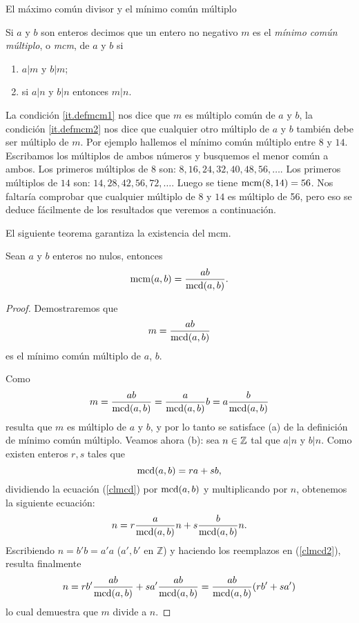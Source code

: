 \begin{section}{El máximo común divisor y el mínimo común múltiplo}
\begin{definicion}\label{def-mcm}
Si $a$ y $b$ son enteros decimos que un entero no negativo $m$ es el \textit{mínimo común múltiplo}, o \textit{mcm}, de $a$ y $b$ si
\begin{enumerate}[label=\textit{\alph*)}]
\item\label{it.defmcm1} $ a|m$ y $b|m$;
\item\label{it.defmcm2} si $ a|n $ y $b|n$ entonces $ m|n$.
\end{enumerate}
\end{definicion}
La condición \ref{it.defmcm1} nos dice que $m$ es múl\-ti\-plo común de $a$ y $b$, la condición \ref{it.defmcm2} nos dice que cualquier otro múltiplo de $a$ y $b$ también debe ser múltiplo de $m$. Por ejemplo hallemos el mínimo común múltiplo entre $8$ y $14$. Escribamos los múl\-ti\-plos de ambos números y busquemos el menor común a ambos. Los primeros múltiplos de $8$ son: $8,16,24,32,40,48,56,\ldots$. Los primeros múltiplos de $14$ son: $14,28,42,56,72,\ldots$. Luego se tiene $\operatorname{mcm}(8,14)=56$. Nos faltaría  comprobar que cualquier múltiplo de $8$ y $14$ es múltiplo de 56, pero eso se deduce fácilmente de los resultados que veremos a continuación.

El siguiente teorema garantiza la existencia del mcm.

\begin{teorema}\label{t1.7.2} Sean $a$ y $b$ enteros no nulos, entonces
$$
\operatorname{mcm}(a,b)=\frac{a b}{\operatorname{mcd}(a,b)}.
$$
\end{teorema}
\begin{proof} Demostraremos que
$$
m=\frac{a b}{\operatorname{mcd}(a,b)}
$$
es el mínimo común múltiplo de $a$, $b$.

Como
$$
m=\frac{a b}{\operatorname{mcd}(a,b)}=\frac{a}{\operatorname{mcd}(a,b)} b
=a\frac{b}{\operatorname{mcd}(a,b)}
$$
resulta que $m$ es múltiplo de $a$ y $b$, y por lo tanto se satisface (a) de la definición de mínimo común múltiplo. Veamos ahora (b): sea $n \in {\mathbb Z}$ tal que  $a|n$ y $b|n$. Como  existen enteros $r,s$ tales que 
\begin{equation}\label{clmcd}
\operatorname{mcd}(a,b)=ra+sb,
\end{equation} 
dividiendo la ecuación (\ref{clmcd}) por $\operatorname{mcd}(a,b)$ y multiplicando por $n$, obtenemos la si\-guien\-te ecuación:
\begin{equation}\label{clmcd2}
n= r\frac{a}{\operatorname{mcd}(a,b)}n + s\frac{b}{\operatorname{mcd}(a,b)}n.
\end{equation} 
Escribiendo $n=b'b=a'a$ ($a',b'$ en $\mathbb Z$) y haciendo los reemplazos en (\ref{clmcd2}), resulta
finalmente
\begin{equation*}
n= rb'\frac{a b}{\operatorname{mcd}(a,b)}+sa'\frac{a b}{\operatorname{mcd}(a,b)}= \frac{a
b}{\operatorname{mcd}(a,b)}(rb'+sa')
\end{equation*}
lo cual demuestra que $m$ divide a $n$.
\end{proof}


\end{section}
